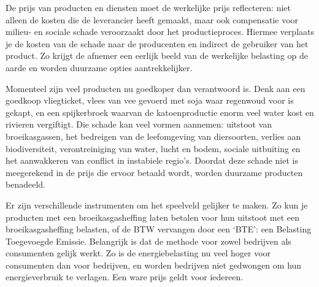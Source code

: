 
De prijs van producten en diensten moet de werkelijke prijs reflecteren: niet alleen de kosten die de leverancier heeft gemaakt, maar ook compensatie voor milieu- en sociale schade veroorzaakt door het productieproces. Hiermee verplaats je de kosten van de schade naar de producenten en indirect de gebruiker van het product. Zo krijgt de afnemer een eerlijk beeld van de werkelijke belasting op de aarde en worden duurzame opties aantrekkelijker.

Momenteel zijn veel producten nu goedkoper dan verantwoord is. Denk aan een goedkoop vliegticket, vlees van vee gevoerd met soja waar regenwoud voor is gekapt, en een spijkerbroek waarvan de katoenproductie enorm veel water kost en rivieren vergiftigt. Die schade kan veel vormen aannemen: uitstoot van broeikasgassen, het bedreigen van de leefomgeving van diersoorten, verlies aan biodiversiteit, verontreiniging van water, lucht en bodem, sociale uitbuiting en het aanwakkeren van conflict in instabiele regio's. Doordat deze schade niet is meegerekend in de prijs die ervoor betaald wordt, worden duurzame producten benadeeld.

Er zijn verschillende instrumenten om het speelveld gelijker te maken. Zo kun je producten met een broeikasgasheffing laten betalen voor hun uitstoot met een broeikasgasheffing belasten, of de BTW vervangen door een ‘BTE’: een Belasting Toegevoegde Emissie.  Belangrijk is dat de methode voor zowel bedrijven als consumenten gelijk werkt. Zo is de energiebelasting nu veel hoger voor consumenten dan voor bedrijven, en worden bedrijven niet gedwongen om hun energieverbruik te verlagen. Een ware prijs geldt voor iedereen.
